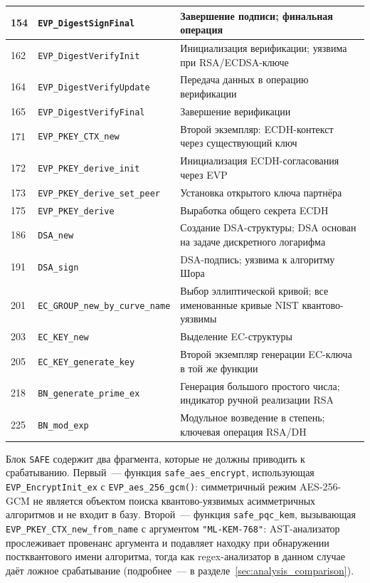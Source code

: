 \begin{longtable}{|p{1.2cm}|p{5.8cm}|p{7.9cm}|}
  154 & \texttt{EVP\_DigestSignFinal}        & Завершение подписи; финальная операция \\ \hline
  162 & \texttt{EVP\_DigestVerifyInit}       & Инициализация верификации; уязвима при RSA/ECDSA-ключе \\ \hline
  164 & \texttt{EVP\_DigestVerifyUpdate}     & Передача данных в операцию верификации \\ \hline
  165 & \texttt{EVP\_DigestVerifyFinal}      & Завершение верификации \\ \hline
  171 & \texttt{EVP\_PKEY\_CTX\_new}         & Второй экземпляр: ECDH-контекст через существующий ключ \\ \hline
  172 & \texttt{EVP\_PKEY\_derive\_init}     & Инициализация ECDH-согласования через EVP \\ \hline
  173 & \texttt{EVP\_PKEY\_derive\_set\_peer}& Установка открытого ключа партнёра \\ \hline
  175 & \texttt{EVP\_PKEY\_derive}           & Выработка общего секрета ECDH \\ \hline
  186 & \texttt{DSA\_new}                    & Создание DSA-структуры; DSA основан на задаче дискретного логарифма \\ \hline
  191 & \texttt{DSA\_sign}                   & DSA-подпись; уязвима к алгоритму Шора \\ \hline
  201 & \texttt{EC\_GROUP\_new\_by\_curve\_name} & Выбор эллиптической кривой; все именованные кривые NIST квантово-уязвимы \\ \hline
  203 & \texttt{EC\_KEY\_new}                & Выделение EC-структуры \\ \hline
  205 & \texttt{EC\_KEY\_generate\_key}      & Второй экземпляр генерации EC-ключа в той же функции \\ \hline
  218 & \texttt{BN\_generate\_prime\_ex}     & Генерация большого простого числа; индикатор ручной реализации RSA \\ \hline
  225 & \texttt{BN\_mod\_exp}                & Модульное возведение в степень; ключевая операция RSA/DH \\ \hline

\end{longtable}

Блок \texttt{SAFE} содержит два фрагмента, которые не должны приводить
к срабатыванию.
Первый~--- функция \texttt{safe\_aes\_encrypt}, использующая
\texttt{EVP\_EncryptInit\_ex} с \texttt{EVP\_aes\_256\_gcm()}: симметричный
режим AES-256-GCM не является объектом поиска квантово-уязвимых
асимметричных алгоритмов и не входит в базу.
Второй~--- функция \texttt{safe\_pqc\_kem}, вызывающая
\texttt{EVP\_PKEY\_CTX\_new\_from\_name} с аргументом
\texttt{"ML-KEM-768"}: AST-анализатор прослеживает провенанс
аргумента и подавляет находку при обнаружении постквантового имени
алгоритма, тогда как regex-анализатор в данном случае даёт ложное
срабатывание (подробнее~--- в разделе~\ref{sec:analysis_comparison}).

